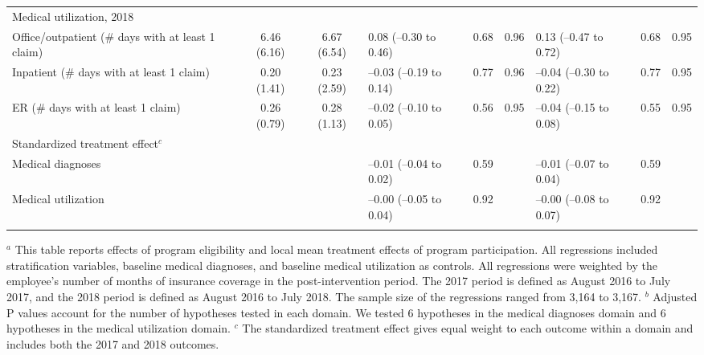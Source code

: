 \documentclass{article}
\begin{document}
\begin{landscape}
\begin{table}[tbp]
{\begin{tabularx}{\linewidth}{lCClCClCC}
Medical utilization, 2018&&&&&&&& \tabularnewline
\hspace{1em} Office/outpatient (\# days with at least 1 claim)&6.46  (6.16)&6.67  (6.54)&0.08 (--0.30 to 0.46)&0.68&0.96&0.13 (--0.47 to 0.72)&0.68&0.95 \tabularnewline
\hspace{1em} Inpatient (\# days with at least 1 claim)&0.20  (1.41)&0.23  (2.59)&--0.03 (--0.19 to 0.14)&0.77&0.96&--0.04 (--0.30 to 0.22)&0.77&0.95 \tabularnewline
\hspace{1em} ER (\# days with at least 1 claim)&0.26  (0.79)&0.28  (1.13)&--0.02 (--0.10 to 0.05)&0.56&0.95&--0.04 (--0.15 to 0.08)&0.55&0.95 \tabularnewline
Standardized treatment effect$^{c}$&&&&&&&& \tabularnewline
\hspace{1em} Medical diagnoses&&&--0.01 (--0.04 to 0.02)&0.59&&--0.01 (--0.07 to 0.04)&0.59& \tabularnewline
\hspace{1em} Medical utilization&&&--0.00 (--0.05 to 0.04)&0.92&&--0.00 (--0.08 to 0.07)&0.92& \tabularnewline
\bottomrule \addlinespace[\belowrulesep]

\end{tabularx}
\begin{flushleft}
\tiny $^{a}$ This table reports effects of program eligibility and local mean treatment effects of program participation. All regressions included stratification variables, baseline medical diagnoses, and baseline medical utilization as controls. All regressions were weighted by the employee's number of months of insurance coverage in the post-intervention period. The 2017 period is defined as August 2016 to July 2017, and the 2018 period is defined as August 2016 to July 2018. The sample size of the regressions ranged from 3,164 to 3,167. \newline $^{b}$ Adjusted P values account for the number of hypotheses tested in each domain. We tested 6 hypotheses in the medical diagnoses domain and 6 hypotheses in the medical utilization domain. \newline $^{c}$ The standardized treatment effect gives equal weight to each outcome within a domain and includes both the 2017 and 2018 outcomes.
\end{flushleft}
}
\end{table}
\end{landscape}
\end{document}
